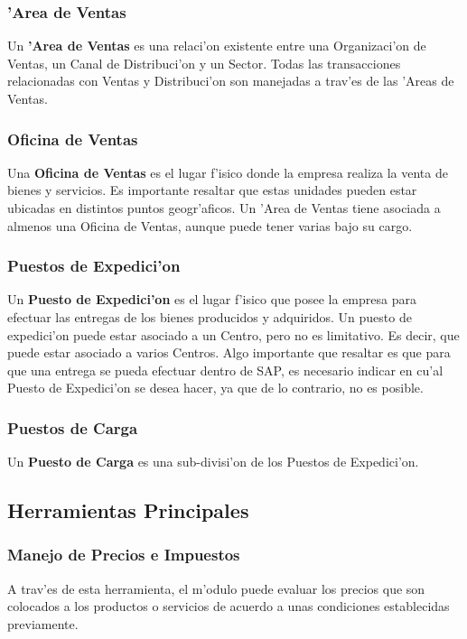 \subsubsection{'Area de Ventas}
	Un \textbf{'Area de Ventas} es una relaci'on existente entre una Organizaci'on de Ventas, un Canal de Distribuci'on y un Sector. Todas las transacciones relacionadas con Ventas y Distribuci'on son manejadas a trav'es de las 'Areas de Ventas.
	
\subsubsection{Oficina de Ventas}
	Una \textbf{Oficina de Ventas} es el lugar f'isico donde la empresa realiza la venta de bienes y servicios. Es importante resaltar que estas unidades pueden estar ubicadas en distintos puntos geogr'aficos. 
	Un 'Area de Ventas tiene asociada a almenos una Oficina de Ventas, aunque puede tener varias bajo su cargo.

\subsubsection{Puestos de Expedici'on}
	Un \textbf{Puesto de Expedici'on} es el lugar f'isico que posee la empresa para efectuar las entregas de los bienes producidos y adquiridos.
	Un puesto de expedici'on puede estar asociado a un Centro, pero no es limitativo. Es decir, que puede estar asociado a varios Centros.
	Algo importante que resaltar es que para que una entrega se pueda efectuar dentro de SAP, es necesario indicar en cu'al Puesto de Expedici'on se desea hacer, ya que de lo contrario, no es posible.
	
\subsubsection{Puestos de Carga}
	Un \textbf{Puesto de Carga} es una sub-divisi'on de los Puestos de Expedici'on. 

\subsection{Herramientas Principales}
\subsubsection{Manejo de Precios e Impuestos}
A trav'es de esta herramienta, el m'odulo puede evaluar los precios que son colocados a los productos o servicios de acuerdo a unas condiciones establecidas previamente. 
